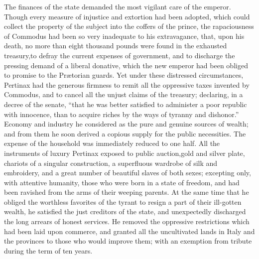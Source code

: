 The finances of the state demanded the most vigilant care of the
emperor. Though every measure of injustice and extortion had been
adopted, which could collect the property of the subject into the
coffers of the prince, the rapaciousness of Commodus had been so
very inadequate to his extravagance, that, upon his death, no
more than eight thousand pounds were found in the exhausted
treasury,\footnotemark[50] to defray the current expenses of government, and to
discharge the pressing demand of a liberal donative, which the
new emperor had been obliged to promise to the Prætorian guards.
Yet under these distressed circumstances, Pertinax had the
generous firmness to remit all the oppressive taxes invented by
Commodus, and to cancel all the unjust claims of the treasury;
declaring, in a decree of the senate, “that he was better
satisfied to administer a poor republic with innocence, than to
acquire riches by the ways of tyranny and dishonor.” Economy and
industry he considered as the pure and genuine sources of wealth;
and from them he soon derived a copious supply for the public
necessities. The expense of the household was immediately reduced
to one half. All the instruments of luxury Pertinax exposed to
public auction,\footnotemark[51] gold and silver plate, chariots of a singular
construction, a superfluous wardrobe of silk and embroidery, and
a great number of beautiful slaves of both sexes; excepting only,
with attentive humanity, those who were born in a state of
freedom, and had been ravished from the arms of their weeping
parents. At the same time that he obliged the worthless favorites
of the tyrant to resign a part of their ill-gotten wealth, he
satisfied the just creditors of the state, and unexpectedly
discharged the long arrears of honest services. He removed the
oppressive restrictions which had been laid upon commerce, and
granted all the uncultivated lands in Italy and the provinces to
those who would improve them; with an exemption from tribute
during the term of ten years.\footnotemark[52]



